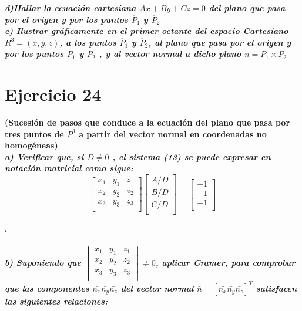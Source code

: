 \documentclass[12pt]{article}
\begin{document}
\textit{\textbf{
d)Hallar la ecuación cartesiana $Ax+By+Cz=0$ del plano que pasa por el origen y por los puntos $\overline{P}_{1}$ y $\overline{P}_{2}$}}
\\

\textit{\textbf{
e) Ilustrar gráficamente en el primer octante del espacio Cartesiano $R^{3} ={(x,y,z)}$, a los puntos $\overline{P}_{1}$ y $\overline{P}_{2}$, al plano que pasa por el origen y por los puntos $\overline{P}_{1}$ y $\overline{P}_{2}$ , y al vector normal a dicho plano $n= \overline{P}_{1} \times \overline{P}_{2}$}}




\section{Ejercicio 24}
\textbf{
(Sucesión de pasos que conduce a la ecuación del plano que pasa por tres puntos de $P^{3}$ a partir del vector normal en coordenadas no homogéneas)}
\\

\textit{\textbf{
a) Verificar que, si $D\neq 0$ , el sistema (13) se puede expresar en notación
matricial como sigue: 
}}
$$ 
\begin{bmatrix}
x_{1} & y_{1}  & z_{1} \\
x_{2} & y_{2}  & z_{2} \\
x_{3} & y_{3}  & z_{3} \\
\end{bmatrix}
\begin{bmatrix}
A/D \\
B/D \\
C/D  \\
\end{bmatrix}  =
\begin{bmatrix}
-1 \\
-1 \\
-1  \\
\end{bmatrix}  
 $$
\\`


\textit{\textbf{
b) Suponiendo que $\begin{vmatrix}
x_{1} & y_{1}  & z_{1} \\
x_{2} & y_{2}  & z_{2} \\
x_{3} & y_{3}  & z_{3} \\
\end{vmatrix} \neq 0$,
aplicar Cramer, para comprobar que
las componentes $\bar{n_{x}} \bar{n_{y}} \bar{n_{z}}$  del vector normal $\bar{n}=[\bar{n_{x}} \bar{n_{y}} \bar{n_{z}}]^{T}$
satisfacen las siguientes relaciones:
}}
\end{document}
